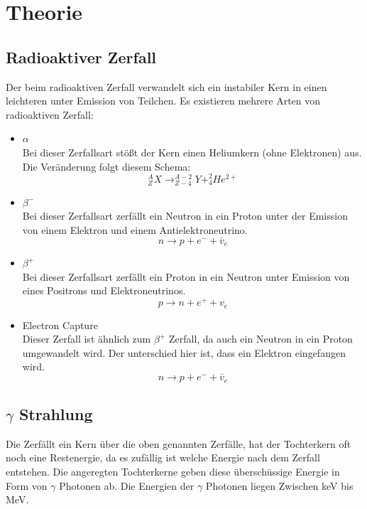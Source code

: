 \section{Theorie}
\subsection{Radioaktiver Zerfall}
Der beim radioaktiven Zerfall verwandelt sich ein instabiler Kern in einen leichteren unter Emission von Teilchen. Es existieren mehrere Arten von radioaktiven Zerfall: 
\begin{itemize}
 \item $\alpha$\\
  {Bei dieser Zerfallsart stößt der Kern einen Heliumkern (ohne Elektronen) aus. Die Veränderung folgt diesem Schema:
  $$_Z^AX \rightarrow _{Z-4}^{A-2}Y + _4^2He^{2+}$$}
 \item $\beta^-$\\
 {Bei dieser Zerfallsart zerfällt ein Neutron in ein Proton unter der Emission von einem Elektron und einem Antielektroneutrino.  
 $$n\rightarrow p+e^-+\bar{v}_e$$} 
 \item $\beta^+$\\
 {Bei dieser Zerfallsart zerfällt ein Proton in ein Neutron unter Emission von eines Positrons und Elektroneutrinos.
 $$p\rightarrow n+e^++v_e$$}
 \item Electron Capture\\
  {Dieser Zerfall ist ähnlich zum $\beta^+$ Zerfall, da auch ein Neutron in ein Proton umgewandelt wird. Der unterschied hier ist, dass ein Elektron eingefangen wird.
 $$n\rightarrow p+e^-+\bar{v}_e$$}
\end{itemize}

\subsection{$\gamma$ Strahlung}
Die Zerfällt ein Kern über die oben genannten Zerfälle, hat der Tochterkern oft noch eine Restenergie, da es zufällig ist welche Energie nach dem Zerfall entstehen. Die angeregten Tochterkerne geben diese überschüssige Energie in Form von $\gamma$ Photonen ab. Die Energien der $\gamma$ Photonen liegen Zwischen keV bis MeV. 
